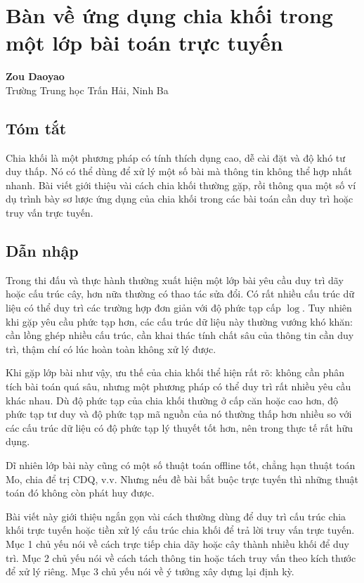 \documentclass[11pt]{article}
\begin{document}
\section{Bàn về ứng dụng chia khối trong một lớp bài toán trực tuyến}

\begin{center}
\textbf{Zou Daoyao}\\
Trường Trung học Trấn Hải, Ninh Ba
\end{center}

\subsection*{Tóm tắt}

Chia khối là một phương pháp có tính thích dụng cao, dễ cài đặt và độ khó tư
duy thấp. Nó có thể dùng để xử lý một số bài mà thông tin không thể hợp nhất
nhanh. Bài viết giới thiệu vài cách chia khối thường gặp, rồi thông qua một số
ví dụ trình bày sơ lược ứng dụng của chia khối trong các bài toán cần duy trì
hoặc truy vấn trực tuyến.

\subsection{Dẫn nhập}

Trong thi đấu và thực hành thường xuất hiện một lớp bài yêu cầu duy trì dãy
hoặc cấu trúc cây, hơn nữa thường có thao tác sửa đổi. Có rất nhiều cấu trúc dữ
liệu có thể duy trì các trường hợp đơn giản với độ phức tạp cấp \(\log\). Tuy
nhiên khi gặp yêu cầu phức tạp hơn, các cấu trúc dữ liệu này thường vướng khó
khăn: cần lồng ghép nhiều cấu trúc, cần khai thác tính chất sâu của thông tin
cần duy trì, thậm chí có lúc hoàn toàn không xử lý được.

Khi gặp lớp bài như vậy, ưu thế của chia khối thể hiện rất rõ: không cần phân
tích bài toán quá sâu, nhưng một phương pháp có thể duy trì rất nhiều yêu cầu
khác nhau. Dù độ phức tạp của chia khối thường ở cấp căn hoặc cao hơn, độ phức
tạp tư duy và độ phức tạp mã nguồn của nó thường thấp hơn nhiều so với các cấu
trúc dữ liệu có độ phức tạp lý thuyết tốt hơn, nên trong thực tế rất hữu dụng.

Dĩ nhiên lớp bài này cũng có một số thuật toán offline tốt, chẳng hạn thuật
toán Mo, chia để trị CDQ, v.v. Nhưng nếu đề bài bắt buộc trực tuyến thì những
thuật toán đó không còn phát huy được.

Bài viết này giới thiệu ngắn gọn vài cách thường dùng để duy trì cấu trúc chia
khối trực tuyến hoặc tiền xử lý cấu trúc chia khối để trả lời truy vấn trực
tuyến. Mục 1 chủ yếu nói về cách trực tiếp chia dãy hoặc cây thành nhiều khối
để duy trì. Mục 2 chủ yếu nói về cách tách thông tin hoặc tách truy vấn theo
kích thước để xử lý riêng. Mục 3 chủ yếu nói về ý tưởng xây dựng lại định kỳ.
\end{document}
